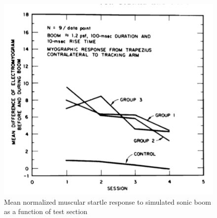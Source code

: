 \documentclass[]{aiaa-tc}%
\begin{document}
\begin{figure}[tb!]
  \centering
  \includegraphics[width=\textwidth]{figs/startle.png}
  \caption{Mean normalized muscular startle response to simulated sonic boom as a function of test section~\cite{sixsubjects}}
  \label{fig:startle}
\end{figure}





\nocite{*}

\end{document}
